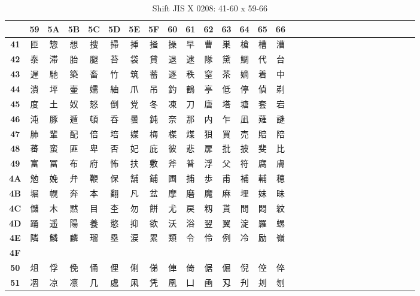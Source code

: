 \begin{table}[H]
\centering
\caption{Shift JIS X 0208: 41-60 x 59-66}
\begin{tabular}{|Sc|Sc|Sc|Sc|Sc|Sc|Sc|Sc|Sc|Sc|Sc|Sc|Sc|Sc|Sc|}
\hline
 & \textbf{59} & \textbf{5A} & \textbf{5B} & \textbf{5C} & \textbf{5D} & \textbf{5E} & \textbf{5F} & \textbf{60} & \textbf{61} & \textbf{62} & \textbf{63} & \textbf{64} & \textbf{65} & \textbf{66} \\ \hline
\textbf{41} & 匝 & 惣 & 想 & 捜 & 掃 & 挿 & 掻 & 操 & 早 & 曹 & 巣 & 槍 & 槽 & 漕 \\ \hline
\textbf{42} & 泰 & 滞 & 胎 & 腿 & 苔 & 袋 & 貸 & 退 & 逮 & 隊 & 黛 & 鯛 & 代 & 台 \\ \hline
\textbf{43} & 遅 & 馳 & 築 & 畜 & 竹 & 筑 & 蓄 & 逐 & 秩 & 窒 & 茶 & 嫡 & 着 & 中 \\ \hline
\textbf{44} & 潰 & 坪 & 壷 & 嬬 & 紬 & 爪 & 吊 & 釣 & 鶴 & 亭 & 低 & 停 & 偵 & 剃 \\ \hline
\textbf{45} & 度 & 土 & 奴 & 怒 & 倒 & 党 & 冬 & 凍 & 刀 & 唐 & 塔 & 塘 & 套 & 宕 \\ \hline
\textbf{46} & 沌 & 豚 & 遁 & 頓 & 呑 & 曇 & 鈍 & 奈 & 那 & 内 & 乍 & 凪 & 薙 & 謎 \\ \hline
\textbf{47} & 肺 & 輩 & 配 & 倍 & 培 & 媒 & 梅 & 楳 & 煤 & 狽 & 買 & 売 & 賠 & 陪 \\ \hline
\textbf{48} & 蕃 & 蛮 & 匪 & 卑 & 否 & 妃 & 庇 & 彼 & 悲 & 扉 & 批 & 披 & 斐 & 比 \\ \hline
\textbf{49} & 富 & 冨 & 布 & 府 & 怖 & 扶 & 敷 & 斧 & 普 & 浮 & 父 & 符 & 腐 & 膚 \\ \hline
\textbf{4A} & 勉 & 娩 & 弁 & 鞭 & 保 & 舗 & 鋪 & 圃 & 捕 & 歩 & 甫 & 補 & 輔 & 穂 \\ \hline
\textbf{4B} & 堀 & 幌 & 奔 & 本 & 翻 & 凡 & 盆 & 摩 & 磨 & 魔 & 麻 & 埋 & 妹 & 昧 \\ \hline
\textbf{4C} & 儲 & 木 & 黙 & 目 & 杢 & 勿 & 餅 & 尤 & 戻 & 籾 & 貰 & 問 & 悶 & 紋 \\ \hline
\textbf{4D} & 踊 & 遥 & 陽 & 養 & 慾 & 抑 & 欲 & 沃 & 浴 & 翌 & 翼 & 淀 & 羅 & 螺 \\ \hline
\textbf{4E} & 隣 & 鱗 & 麟 & 瑠 & 塁 & 涙 & 累 & 類 & 令 & 伶 & 例 & 冷 & 励 & 嶺 \\ \hline
\textbf{4F} &  &  &  &  &  &  &  &  &  &  &  &  &  &  \\ \hline
\textbf{50} & 俎 & 俘 & 俛 & 俑 & 俚 & 俐 & 俤 & 俥 & 倚 & 倨 & 倔 & 倪 & 倥 & 倅 \\ \hline
\textbf{51} & 凅 & 凉 & 凛 & 几 & 處 & 凩 & 凭 & 凰 & 凵 & 凾 & 刄 & 刋 & 刔 & 刎 \\ \hline

\end{tabular}
\end{table}
